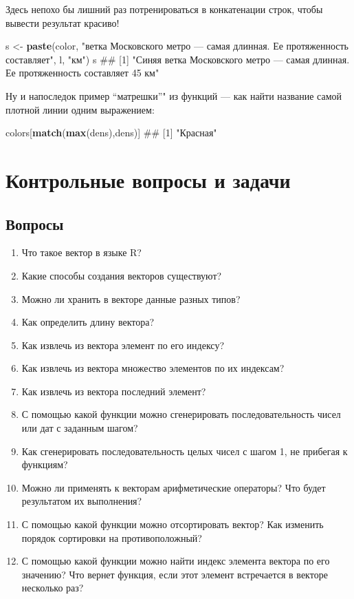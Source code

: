 \documentclass[]{book}
\newenvironment{Shaded}{\begin{snugshade}}{\end{snugshade}}
\newcommand{\KeywordTok}[1]{\textcolor[rgb]{0.13,0.29,0.53}{\textbf{#1}}}
\newcommand{\StringTok}[1]{\textcolor[rgb]{0.31,0.60,0.02}{#1}}
\newcommand{\NormalTok}[1]{#1}
\providecommand{\tightlist}{%
  \setlength{\itemsep}{0pt}\setlength{\parskip}{0pt}}
\begin{document}
Здесь непохо бы лишний раз потренироваться в конкатенации строк, чтобы
вывести результат красиво!

\begin{Shaded}
\begin{Highlighting}[]
\NormalTok{s <-}\StringTok{ }\KeywordTok{paste}\NormalTok{(color, }\StringTok{"ветка Московского метро — самая длинная. Ее протяженность составляет"}\NormalTok{, l, }\StringTok{"км"}\NormalTok{)}
\NormalTok{s}
\NormalTok{## [1] "Синяя ветка Московского метро — самая длинная. Ее протяженность составляет 45 км"}
\end{Highlighting}
\end{Shaded}

Ну и напоследок пример ``матрешки''" из функций --- как найти название
самой плотной линии одним выражением:

\begin{Shaded}
\begin{Highlighting}[]
\NormalTok{colors[}\KeywordTok{match}\NormalTok{(}\KeywordTok{max}\NormalTok{(dens),dens)]}
\NormalTok{## [1] "Красная"}
\end{Highlighting}
\end{Shaded}

\section{Контрольные вопросы и задачи}\label{questions_tasks_vectors}

\subsection{Вопросы}\label{questions_vectors}

\begin{enumerate}
\def\labelenumi{\arabic{enumi}.}
\tightlist
\item
  Что такое вектор в языке R?
\item
  Какие способы создания векторов существуют?
\item
  Можно ли хранить в векторе данные разных типов?
\item
  Как определить длину вектора?
\item
  Как извлечь из вектора элемент по его индексу?
\item
  Как извлечь из вектора множество элементов по их индексам?
\item
  Как извлечь из вектора последний элемент?
\item
  С помощью какой функции можно сгенерировать последовательность чисел
  или дат с заданным шагом?
\item
  Как сгенерировать последовательность целых чисел с шагом 1, не
  прибегая к функциям?
\item
  Можно ли применять к векторам арифметические операторы? Что будет
  результатом их выполнения?
\item
  С помощью какой функции можно отсортировать вектор? Как изменить
  порядок сортировки на противоположный?
\item
  С помощью какой функции можно найти индекс элемента вектора по его
  значению? Что вернет функция, если этот элемент встречается в векторе
  несколько раз?
\end{enumerate}
\end{document}
